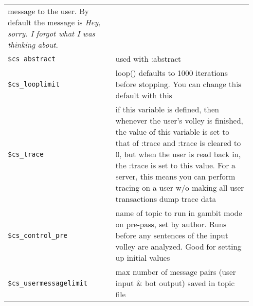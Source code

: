 \documentclass[]{article}
\begin{document}
\begin{longtable}[]{@{}ll@{}}
\begin{minipage}[t]{0.10\columnwidth}
message to the user. By default the message is \emph{Hey, sorry. I
forgot what I was thinking about.}\strut
\end{minipage}\tabularnewline
\begin{minipage}[t]{0.26\columnwidth}\raggedright\strut
\texttt{\$cs\_abstract}\strut
\end{minipage} & \begin{minipage}[t]{0.10\columnwidth}\raggedright\strut
used with :abstract\strut
\end{minipage}\tabularnewline
\begin{minipage}[t]{0.26\columnwidth}\raggedright\strut
\texttt{\$cs\_looplimit}\strut
\end{minipage} & \begin{minipage}[t]{0.10\columnwidth}\raggedright\strut
loop() defaults to 1000 iterations before stopping. You can change this
default with this\strut
\end{minipage}\tabularnewline
\begin{minipage}[t]{0.26\columnwidth}\raggedright\strut
\texttt{\$cs\_trace}\strut
\end{minipage} & \begin{minipage}[t]{0.10\columnwidth}\raggedright\strut
if this variable is defined, then whenever the user's volley is
finished, the value of this variable is set to that of :trace and :trace
is cleared to 0, but when the user is read back in, the :trace is set to
this value. For a server, this means you can perform tracing on a user
w/o making all user transactions dump trace data\strut
\end{minipage}\tabularnewline
\begin{minipage}[t]{0.26\columnwidth}\raggedright\strut
\texttt{\$cs\_control\_pre}\strut
\end{minipage} & \begin{minipage}[t]{0.10\columnwidth}\raggedright\strut
name of topic to run in gambit mode on pre-pass, set by author. Runs
before any sentences of the input volley are analyzed. Good for setting
up initial values\strut
\end{minipage}\tabularnewline
\begin{minipage}[t]{0.26\columnwidth}\raggedright\strut
\texttt{\$cs\_usermessagelimit}\strut
\end{minipage} & \begin{minipage}[t]{0.10\columnwidth}\raggedright\strut
max number of message pairs (user input \& bot output) saved in topic
file\strut
\end{minipage}\tabularnewline

\end{longtable}
\end{document}
